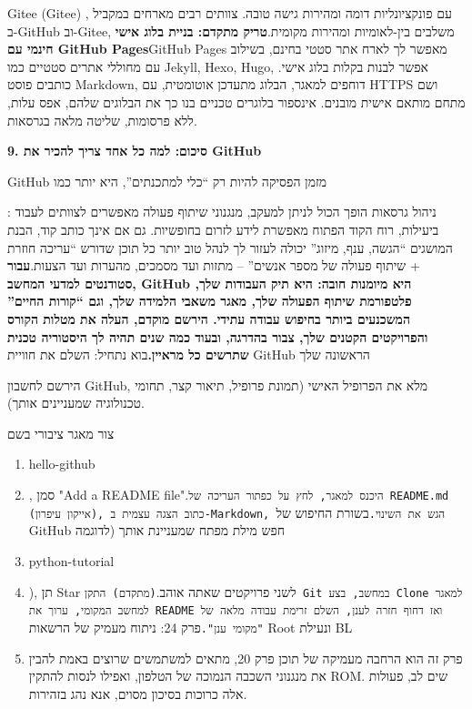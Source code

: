 \begin{tcbinfo}{Gitee (Gitee)}
, עם פונקציונליות דומה ומהירות גישה טובה. צוותים רבים מארחים במקביל ב-GitHub וב-Gitee, משלבים בין-לאומיות ומהירות מקומית.\textbf{טריק מתקדם: בניית בלוג אישי חינמי עם GitHub Pages}GitHub Pages מאפשר לך לארח אתר סטטי בחינם, בשילוב עם מחוללי אתרים סטטיים כמו Jekyll, Hexo, Hugo, אפשר לבנות בקלות בלוג אישי. כותבים פוסט Markdown, דוחפים למאגר, הבלוג מתעדכן אוטומטית, עם HTTPS ושם מתחם מותאם אישית מובנים. אינספור בלוגרים טכניים בנו כך את הבלוגים שלהם, אפס עלות, ללא פרסומות, שליטה מלאה בגרסאות.

\end{tcbinfo}

\textbf{9. סיכום: למה כל אחד צריך להכיר את GitHub}\par

GitHub מזמן הפסיקה להיות רק “כלי למתכנתים”, היא יותר כמו


: ניהול גרסאות הופך הכול לניתן למעקב, מנגנוני שיתוף פעולה מאפשרים לצוותים לעבוד ביעילות, רוח הקוד הפתוח מאפשרת לידע לזרום בחופשיות. גם אם אינך כותב קוד, הבנת המושגים “הגשה, ענף, מיזוג” יכולה לעזור לך לנהל טוב יותר כל תוכן שדורש “עריכה חוזרת + שיתוף פעולה של מספר אנשים” – מתזות ועד מסמכים, מהערות ועד הצעות.\textbf{עבור סטודנטים למדעי המחשב, GitHub היא מיומנות חובה: היא תיק העבודות שלך, פלטפורמת שיתוף הפעולה שלך, מאגר משאבי הלמידה שלך, וגם “קורות החיים” המשכנעים ביותר בחיפוש עבודה עתידי. הירשם מוקדם, העלה את מטלות הקורס והפרויקטים הקטנים שלך, צבור בהדרגה, ובעוד כמה שנים תהיה לך היסטוריה טכנית שתרשים כל מראיין.}בוא נתחיל: השלם את חוויית GitHub הראשונה שלך

הירשם לחשבון GitHub, מלא את הפרופיל האישי (תמונת פרופיל, תיאור קצר, תחומי טכנולוגיה שמעניינים אותך).

\begin{tcbpractice}{צור מאגר ציבורי בשם}
\begin{enumerate}
  \item hello-github
  \item , סמן "Add a README file".\texttt{היכנס למאגר, לחץ על כפתור העריכה של README.\allowbreak md (אייקון עיפרון), כתוב הצגה עצמית ב-\allowbreak Markdown, הגש את השינוי.\allowbreak }בשורת החיפוש של GitHub חפש מילת מפתח שמעניינת אותך (לדוגמה
  \item python-tutorial
  \item ), תן Star לשני פרויקטים שאתה אוהב.\texttt{(מתקדם) התקן Git במחשב, בצע Clone למאגר למחשב המקומי, ערוך את README ואז דחוף חזרה לענן, השלם זרימת עבודה מלאה של "מקומי ענן".\allowbreak }פרק 24: ניתוח מעמיק של הרשאות Root ונעילת BL
  \item פרק זה הוא הרחבה מעמיקה של תוכן פרק 20, מתאים למשתמשים שרוצים באמת להבין את מנגנוני השכבה הנמוכה של הטלפון, ואפילו לנסות להתקין ROM. שים לב, פעולות אלה כרוכות בסיכון מסוים, אנא נהג בזהירות.
\end{enumerate}

\end{tcbpractice}
